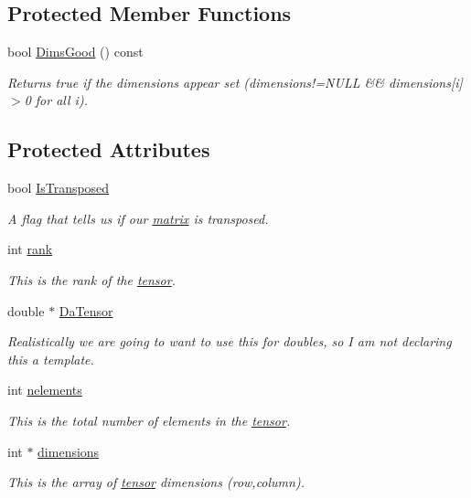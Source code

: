 \subsection*{Protected Member Functions}
\begin{DoxyCompactItemize}
\item 
bool \hyperlink{classJKBuilder_1_1tensor_a6e72344440b411f433eb50171648c2d0}{DimsGood} () const 
\begin{DoxyCompactList}\small\item\em Returns true if the dimensions appear set (dimensions!=NULL \&\& dimensions\mbox{[}i\mbox{]}$>$0 for all i). \item\end{DoxyCompactList}\end{DoxyCompactItemize}
\subsection*{Protected Attributes}
\begin{DoxyCompactItemize}
\item 
bool \hyperlink{classJKBuilder_1_1matrix_a77fa48e57c519482de2ec7ec182b16ef}{IsTransposed}
\begin{DoxyCompactList}\small\item\em A flag that tells us if our \hyperlink{classJKBuilder_1_1matrix}{matrix} is transposed. \item\end{DoxyCompactList}\item 
int \hyperlink{classJKBuilder_1_1tensor_a6cfd95afd0afebd625b889fb6e58371c}{rank}
\begin{DoxyCompactList}\small\item\em This is the rank of the \hyperlink{classJKBuilder_1_1tensor}{tensor}. \item\end{DoxyCompactList}\item 
double $\ast$ \hyperlink{classJKBuilder_1_1tensor_a91f7b1e58c0e5d1a49ddb8b80ab7790e}{DaTensor}
\begin{DoxyCompactList}\small\item\em Realistically we are going to want to use this for doubles, so I am not declaring this a template. \item\end{DoxyCompactList}\item 
int \hyperlink{classJKBuilder_1_1tensor_a23ae6a00bed19d2ad34d439636e797da}{nelements}
\begin{DoxyCompactList}\small\item\em This is the total number of elements in the \hyperlink{classJKBuilder_1_1tensor}{tensor}. \item\end{DoxyCompactList}\item 
int $\ast$ \hyperlink{classJKBuilder_1_1tensor_a2ce1e6e0782ddee097f2c4aa2663d3e9}{dimensions}
\begin{DoxyCompactList}\small\item\em This is the array of \hyperlink{classJKBuilder_1_1tensor}{tensor} dimensions (row,column). \item\end{DoxyCompactList}\end{DoxyCompactItemize}
